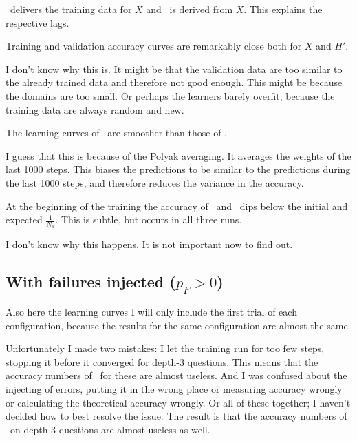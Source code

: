 \documentclass{farlamp}
\begin{document}
\AmpHp\ delivers the training data for $X$ and \Xpa\ is derived from $X$. This
explains the respective lags.

\Obs Training and validation accuracy curves are remarkably close both
for $X$ and $H'$.

\Disc I don't know why this is. \OQ It might be that the validation data
are too similar to the already trained data and therefore not good enough. This
might be because the domains are too small. Or perhaps the learners barely
overfit, because the training data are always random and new.

\Obs The learning curves of \Xpa\ are smoother than those of \AmpHp.

\Disc I guess that this is because of the Polyak averaging. It averages
the weights of the last 1000 steps. This biases the predictions to be similar to
the predictions during the last 1000 steps, and therefore reduces the variance
in the accuracy.

\Obs At the beginning of the training the accuracy of \AmpHp\ and \Xpa\
dips below the initial and expected $\frac{1}{N_a}$. This is subtle, but occurs
in all three runs.

\Disc I don't know why this happens. \OQ It is not important now to find
out.


\subsection{With failures injected ($p_F > 0$)}

Also here the learning curves I will only include the first trial of each
configuration, because the results for the same configuration are almost the
same.

Unfortunately I made two mistakes: I let the training run for too few steps,
stopping it before it converged for depth-3 questions. This means that the
accuracy numbers of \Xpa\ for these are almost useless. And I was confused about
the injecting of errors, putting it in the wrong place or measuring accuracy
wrongly or calculating the theoretical accuracy wrongly. Or all of these
together; I haven't decided how to best resolve the issue. The result is that
the accuracy numbers of \AmpHp\ on depth-3 questions are almost useless as well.
\end{document}

